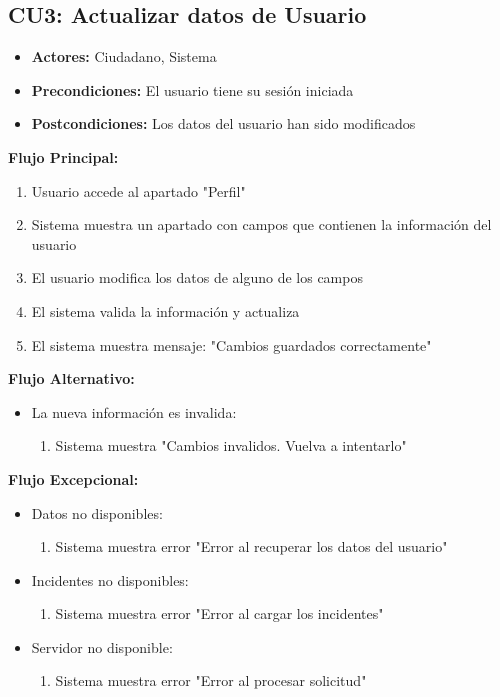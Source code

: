 \begin{multicols}{2}
\subsection*{CU3: Actualizar datos de Usuario}
\begin{itemize}
    \item \textbf{Actores:} Ciudadano, Sistema
    \item \textbf{Precondiciones:} El usuario tiene su sesión iniciada
    \item \textbf{Postcondiciones:} Los datos del usuario han sido modificados
\end{itemize}
\textbf{Flujo Principal:}
\begin{enumerate}
    \item Usuario accede al apartado "Perfil"
    \item Sistema muestra un apartado con campos que contienen la información del usuario
    \item El usuario modifica los datos de alguno de los campos
    \item El sistema valida la información y actualiza
    \item El sistema muestra mensaje: "Cambios guardados correctamente"
\end{enumerate}

\textbf{Flujo Alternativo:}
\begin{itemize}
    \item La nueva información es invalida:
    \begin{enumerate}
        \item Sistema muestra "Cambios invalidos. Vuelva a intentarlo"
    \end{enumerate}
\end{itemize}

\textbf{Flujo Excepcional:}
\begin{itemize}
    \item Datos no disponibles:
    \begin{enumerate}
        \item Sistema muestra error "Error al recuperar los datos del usuario"
    \end{enumerate}
    \item Incidentes no disponibles:
    \begin{enumerate}
        \item Sistema muestra error "Error al cargar los incidentes"
    \end{enumerate}
    \item Servidor no disponible:
    \begin{enumerate}
        \item Sistema muestra error "Error al procesar solicitud"
    \end{enumerate}
\end{itemize}


\end{multicols}
